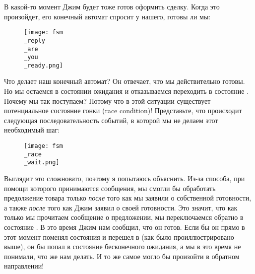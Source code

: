 В какой\--то момент Джим будет тоже готов оформить сделку.
Когда это произойдет, его конечный автомат спросит у нашего, готовы ли мы:


\begin{figure}[h!]
    \centering
    \texttt{[image: fsm\\\_reply\\\_are\\\_you\\\_ready.png]}
\end{figure}

Что делает наш конечный автомат?
Он отвечает, что мы действительно готовы.
Но мы остаемся в состоянии ожидания и отказываемся переходить в состояние .
Почему мы так поступаем?
Потому что в этой ситуации существует потенциальное состояние гонки (race condition)!
Представьте, что происходит следующая последовательность событий, в которой мы не делаем этот необходимый шаг:

\begin{figure}[h!]
    \centering
    \texttt{[image: fsm\\\_race\\\_wait.png]}
\end{figure}

Выглядит это сложновато, поэтому я попытаюсь объяснить.
Из\--за способа, при помощи которого принимаются сообщения, мы смогли бы обработать предолжение товара только \emph{после} того как мы заявили о собственной готовности, а также \emph{после} того как Джим заявил о своей готовности.
Это значит, что как только мы прочитаем сообщение о предложении, мы переключаемся обратно в состояние .
В это время Джим нам сообщил, что он готов.
Если бы он прямо в этот момент поменял состояния и перешел в  (как было проиллюстрировано выше), он бы попал в состояние бесконечного ожидания, а мы в это время не понимали, что же нам делать.
И то же самое могло бы произойти в обратном направлении!

